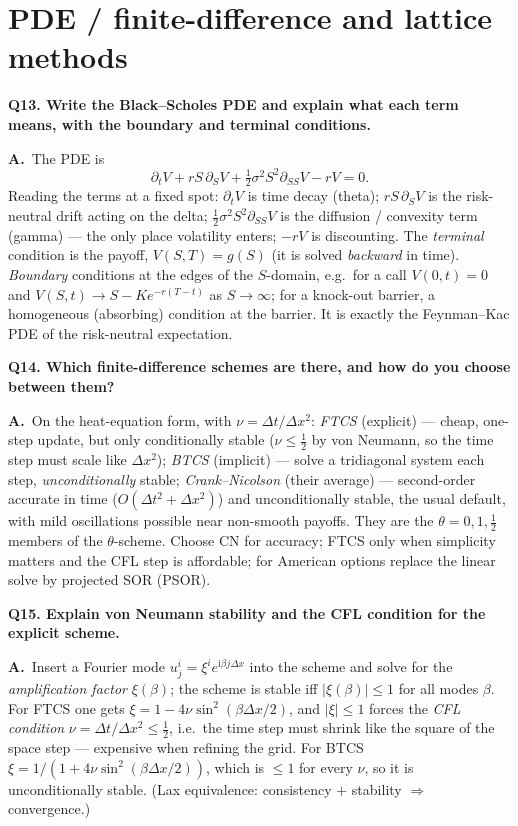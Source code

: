 \documentclass[11pt]{article}
\newcommand{\ii}{\mathrm{i}}
\newcommand{\Qq}[1]{\bigskip\noindent\textbf{\large #1}\par\nobreak\smallskip}
\newcommand{\A}{\noindent\textbf{A.}\ }
\begin{document}
\section{PDE / finite-difference and lattice methods}

\Qq{Q13. Write the Black--Scholes PDE and explain what each term means, with the boundary and terminal conditions.}
\A The PDE is
\[
\partial_t V+rS\,\partial_S V+\tfrac12\sigma^2S^2\partial_{SS}V-rV=0 .
\]
Reading the terms at a fixed spot: $\partial_t V$ is time decay (theta); $rS\,\partial_S V$ is the
risk-neutral drift acting on the delta; $\tfrac12\sigma^2S^2\partial_{SS}V$ is the diffusion / convexity term
(gamma) --- the only place volatility enters; $-rV$ is discounting. The \emph{terminal} condition is the
payoff, $V(S,T)=g(S)$ (it is solved \emph{backward} in time). \emph{Boundary} conditions at the edges of the
$S$-domain, e.g.\ for a call $V(0,t)=0$ and $V(S,t)\to S-Ke^{-r(T-t)}$ as $S\to\infty$; for a knock-out barrier,
a homogeneous (absorbing) condition at the barrier. It is exactly the Feynman--Kac PDE of the risk-neutral
expectation.

\Qq{Q14. Which finite-difference schemes are there, and how do you choose between them?}
\A On the heat-equation form, with $\nu=\Delta t/\Delta x^2$: \emph{FTCS} (explicit) --- cheap, one-step update,
but only conditionally stable ($\nu\le\tfrac12$ by von Neumann, so the time step must scale like $\Delta x^2$);
\emph{BTCS} (implicit) --- solve a tridiagonal system each step, \emph{unconditionally} stable;
\emph{Crank--Nicolson} (their average) --- second-order accurate in time ($O(\Delta t^2+\Delta x^2)$) and
unconditionally stable, the usual default, with mild oscillations possible near non-smooth payoffs. They are
the $\theta=0,1,\tfrac12$ members of the $\theta$-scheme. Choose CN for accuracy; FTCS only when simplicity
matters and the CFL step is affordable; for American options replace the linear solve by projected SOR (PSOR).

\Qq{Q15. Explain von Neumann stability and the CFL condition for the explicit scheme.}
\A Insert a Fourier mode $u_j^i=\xi^i e^{\ii\beta j\Delta x}$ into the scheme and solve for the
\emph{amplification factor} $\xi(\beta)$; the scheme is stable iff $|\xi(\beta)|\le1$ for all modes $\beta$. For
FTCS one gets $\xi=1-4\nu\sin^2(\beta\Delta x/2)$, and $|\xi|\le1$ forces the \emph{CFL condition}
$\nu=\Delta t/\Delta x^2\le\tfrac12$, i.e.\ the time step must shrink like the square of the space step ---
expensive when refining the grid. For BTCS $\xi=1/(1+4\nu\sin^2(\beta\Delta x/2))$, which is $\le1$ for every
$\nu$, so it is unconditionally stable. (Lax equivalence: consistency $+$ stability $\Rightarrow$ convergence.)
\end{document}

